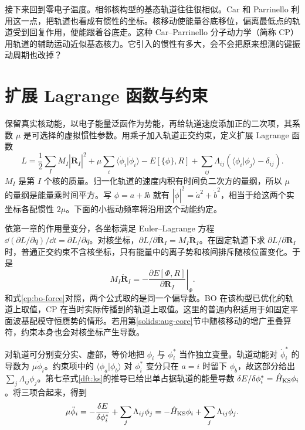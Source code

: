接下来回到零电子温度。相邻核构型的基态轨道往往很相似。Car 和 Parrinello 利用这一点，把轨道也看成有惯性的坐标。核移动使能量谷底移位，偏离最低点的轨道受到回复作用，便能跟着谷底走。这种 Car--Parrinello 分子动力学（简称 CP）用轨道的辅助运动近似基态核力。它引入的惯性有多大，会不会把原来想测的键振动周期也改掉？

\section{扩展 Lagrange 函数与约束}
保留真实核动能，以电子能量泛函作为势能，再给轨道速度添加正的二次项，其系数 $\mu$ 是可选择的虚拟惯性参数。用乘子加入轨道正交约束，定义扩展 Lagrange 函数
\begin{equation}\label{cp:lagrangian}
L=\frac12\sum_I M_I|\dot{\bm R}_I|^2+
\mu\sum_i\langle\dot\phi_i|\dot\phi_i\rangle-E[\{\phi\},R]
+\sum_{ij}\Lambda_{ij}(\langle\phi_i|\phi_j\rangle-\delta_{ij}).
\end{equation}
$M_I$ 是第 $I$ 个核的质量。归一化轨道的速度内积有时间负二次方的量纲，所以 $\mu$ 的量纲是能量乘时间平方。写 $\phi=a+\ii b$ 就有 $|\dot\phi|^2=\dot a^2+\dot b^2$，相当于给这两个实坐标各配惯性 $2\mu$。下面的小振动频率将沿用这个动能约定。

依第一章的作用量变分，各坐标满足 Euler--Lagrange 方程 $\dd(\partial L/\partial\dot q)/\dd t=\partial L/\partial q$。对核坐标，$\partial L/\partial\dot{\bm R}_I=M_I\dot{\bm R}_I$。在固定轨道下求 $\partial L/\partial\bm R_I$ 时，普通正交约束不含核坐标，只有能量中的离子势和核间排斥随核位置变化。于是
\begin{equation}\label{cp:ion-eom}
M_I\ddot{\bm R}_I=-\left.\frac{\partial E[\Phi,R]}{\partial\bm R_I}\right|_{\Phi}.
\end{equation}
和式\eqref{cp:bo-force}对照，两个公式取的是同一个偏导数。BO 在该构型已优化的轨道上取值，CP 在当时实际传播到的轨道上取值。这里的普通内积适用于如固定平面波基配模守恒赝势的情形。若用第\ref{solids:aug-core}节中随核移动的增广重叠算符，约束本身也会对核坐标产生导数。

对轨道可分别变分实、虚部，等价地把 $\phi_i$ 与 $\phi_i^*$ 当作独立变量。轨道动能对 $\dot\phi_i^*$ 的导数为 $\mu\dot\phi_i$。约束项中的 $\langle\phi_a|\phi_b\rangle$ 对 $\phi_i^*$ 变分只在 $a=i$ 时留下 $\phi_b$，故这部分给出 $\sum_j\Lambda_{ij}\phi_j$。第七章式\eqref{dft:ks}的推导已给出单占据轨道的能量导数 $\delta E/\delta\phi_i^*=\hat H_{\rm KS}\phi_i$。将三项合起来，得到
\begin{equation}\label{cp:orbital-eom}
\mu\ddot\phi_i=-\frac{\delta E}{\delta\phi_i^*}+\sum_j\Lambda_{ij}\phi_j
=-\hat H_{\rm KS}\phi_i+\sum_j\Lambda_{ij}\phi_j.
\end{equation}

